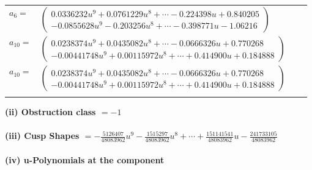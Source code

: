 \documentclass[1p]{elsarticle_modified}
\theoremstyle{definition}
\begin{document}
\begin{tabular}{m{7pt} m{180pt} m{7pt} m{180pt} }
\flushright $a_{6}=$&$\begin{pmatrix}0.0336232 u^{9}+0.0761229 u^{8}+\cdots-0.224398 u+0.840205\\-0.0855628 u^{9}-0.203256 u^{8}+\cdots-0.398771 u-1.06216\end{pmatrix}$ \\
\flushright $a_{10}=$&$\begin{pmatrix}0.0238374 u^{9}+0.0435082 u^{8}+\cdots-0.0666326 u+0.770268\\-0.00441748 u^{9}+0.00115972 u^{8}+\cdots+0.414900 u+0.184888\end{pmatrix}$\\ \flushright $a_{10}=$&$\begin{pmatrix}0.0238374 u^{9}+0.0435082 u^{8}+\cdots-0.0666326 u+0.770268\\-0.00441748 u^{9}+0.00115972 u^{8}+\cdots+0.414900 u+0.184888\end{pmatrix}$\\&\end{tabular}
\flushleft \textbf{(ii) Obstruction class $= -1$}\\~\\
\flushleft \textbf{(iii) Cusp Shapes $= -\frac{5126407}{48083962} u^9-\frac{1515297}{48083962} u^8+\cdots+\frac{151141541}{48083962} u-\frac{241733105}{48083962}$}\\~\\
\newpage\renewcommand{\arraystretch}{1}
\flushleft \textbf{(iv) u-Polynomials at the component}\newline \\
\end{document}
